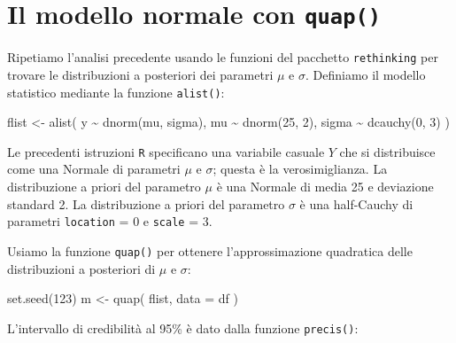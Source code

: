 \documentclass[
  11pt,
]{krantz}
\makeatletter
\newenvironment{Shaded}{\begin{snugshade}}{\end{snugshade}}
\newcommand{\AttributeTok}[1]{\textcolor[rgb]{0.61,0.61,0.61}{#1}}
\newcommand{\DecValTok}[1]{\textcolor[rgb]{0.06,0.06,0.06}{#1}}
\newcommand{\FunctionTok}[1]{\textcolor[rgb]{0,0,0}{#1}}
\newcommand{\NormalTok}[1]{#1}
\newcommand{\OtherTok}[1]{\textcolor[rgb]{0.37,0.37,0.37}{#1}}
\newcommand{\SpecialCharTok}[1]{\textcolor[rgb]{0,0,0}{#1}}
\newenvironment{kframe}{%
\medskip{}
\setlength{\fboxsep}{.8em}
 \def\at@end@of@kframe{}%
 \ifinner\ifhmode%
  \def\at@end@of@kframe{\end{minipage}}%
  \begin{minipage}{\columnwidth}%
 \fi\fi%
 \def\FrameCommand##1{\hskip\@totalleftmargin \hskip-\fboxsep
 \colorbox{shadecolor}{##1}\hskip-\fboxsep
     \hskip-\linewidth \hskip-\@totalleftmargin \hskip\columnwidth}%
 \MakeFramed {\advance\hsize-\width
   \@totalleftmargin\z@ \linewidth\hsize
   \@setminipage}}%
 {\par\unskip\endMakeFramed%
 \at@end@of@kframe}
\renewenvironment{Shaded}{\begin{kframe}}{\end{kframe}}
\theoremstyle{definition}
\theoremstyle{definition}
\theoremstyle{definition}
\theoremstyle{definition}
\theoremstyle{remark}
\makeatother
\begin{document}
\hypertarget{il-modello-normale-con-quap}{%
\section{\texorpdfstring{Il modello normale con \texttt{quap()}}{Il modello normale con quap()}}\label{il-modello-normale-con-quap}}

Ripetiamo l'analisi precedente usando le funzioni del pacchetto \texttt{rethinking} per trovare le distribuzioni a posteriori dei parametri \(\mu\) e \(\sigma\). Definiamo il modello statistico mediante la funzione \texttt{alist()}:

\begin{Shaded}
\begin{Highlighting}[]
\NormalTok{flist }\OtherTok{\textless{}{-}} \FunctionTok{alist}\NormalTok{(}
\NormalTok{  y }\SpecialCharTok{\textasciitilde{}} \FunctionTok{dnorm}\NormalTok{(mu, sigma), }
\NormalTok{  mu }\SpecialCharTok{\textasciitilde{}} \FunctionTok{dnorm}\NormalTok{(}\DecValTok{25}\NormalTok{, }\DecValTok{2}\NormalTok{),}
\NormalTok{  sigma }\SpecialCharTok{\textasciitilde{}} \FunctionTok{dcauchy}\NormalTok{(}\DecValTok{0}\NormalTok{, }\DecValTok{3}\NormalTok{)}
\NormalTok{)}
\end{Highlighting}
\end{Shaded}

Le precedenti istruzioni \texttt{R} specificano una variabile casuale \(Y\) che si distribuisce come una Normale di parametri \(\mu\) e \(\sigma\); questa è la verosimiglianza. La distribuzione a priori del parametro \(\mu\) è una Normale di media 25 e deviazione standard 2. La distribuzione a priori del parametro \(\sigma\) è una half-Cauchy di parametri \texttt{location} = 0 e \texttt{scale} = 3.

Usiamo la funzione \texttt{quap()} per ottenere l'approssimazione quadratica delle distribuzioni a posteriori di \(\mu\) e \(\sigma\):

\begin{Shaded}
\begin{Highlighting}[]
\FunctionTok{set.seed}\NormalTok{(}\DecValTok{123}\NormalTok{)}
\NormalTok{m }\OtherTok{\textless{}{-}} \FunctionTok{quap}\NormalTok{( }
\NormalTok{  flist,}
  \AttributeTok{data =}\NormalTok{ df }
\NormalTok{)}
\end{Highlighting}
\end{Shaded}

L'intervallo di credibilità al 95\% è dato dalla funzione \texttt{precis()}:
\end{document}
